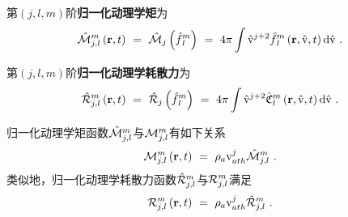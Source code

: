   \begin{definition} \label{定义-归一化动理学矩}
      第$(j,l,m)$阶\textbf{归一化动理学矩}为
      \begin{equation}
        \calMh_{j,l}^m \left(\r,t \right) \ = \ \calMh_j \left(\fhlm \right) \ = \ 4 \pi \int \rmvh^{j+2} \fhlm \left(\r,\rmvh,t \right) \rmd \rmvh ~. \label{Mhjlm}
      \end{equation}
  \end{definition}
  \noindent
  \begin{definition} \label{定义-归一化动理学耗散力}
      第$(j,l,m)$阶\textbf{归一化动理学耗散力}为
      \begin{equation}
          \calRh_{j,l}^m \left(\r,t \right) \ = \ \calRh_j \left(\fhlm \right) \ = \ 4 \pi \int \rmvh^{j+2} \colhlma \left(\r,\rmvh,t \right) \rmd \rmvh ~. \label{Rhjlm}
  \end{equation}
  \end{definition}
  \noindent
  归一化动理学矩函数$\hat{\mathcal{M}}_{j,l}^m$与$\mathcal{M}_{j,l}^m$有如下关系
  \begin{equation}
      \mathcal{M}_{j,l}^m \left(\mathbf{r},t \right) \ = \ \rho_a \mathrm{v}_{ath}^{j} \hat{\mathcal{M}}_{j,l}^m  ~. \label{MMhjlm}
  \end{equation}
  类似地，归一化动理学耗散力函数$\hat{\mathcal{R}}_{j,l}^m$与$\mathcal{R}_{j,l}^m$满足
  \begin{equation}
      \mathcal{R}_{j,l}^m \left(\mathbf{r},t \right) \ = \ \rho_a \mathrm{v}_{ath}^{j} \hat{\mathcal{R}}_{j,l}^m  ~. \label{RRhjlm}
  \end{equation}

